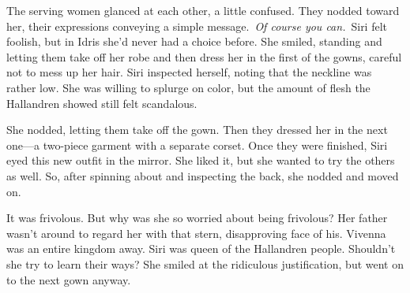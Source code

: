 The serving women glanced at each other, a little confused. They nodded toward her, their expressions conveying a simple message.~\textit{Of course you can.}~Siri felt foolish, but in Idris she’d never had a choice before. She smiled, standing and letting them take off her robe and then dress her in the first of the gowns, careful not to mess up her hair. Siri inspected herself, noting that the neckline was rather low. She was willing to splurge on color, but the amount of flesh the Hallandren showed still felt scandalous.

She nodded, letting them take off the gown. Then they dressed her in the next one—a two-piece garment with a separate corset. Once they were finished, Siri eyed this new outfit in the mirror. She liked it, but she wanted to try the others as well. So, after spinning about and inspecting the back, she nodded and moved on.

It was frivolous. But why was she so worried about being frivolous? Her father wasn’t around to regard her with that stern, disapproving face of his. Vivenna was an entire kingdom away. Siri was queen of the Hallandren people. Shouldn’t she try to learn their ways? She smiled at the ridiculous justification, but went on to the next gown anyway.

